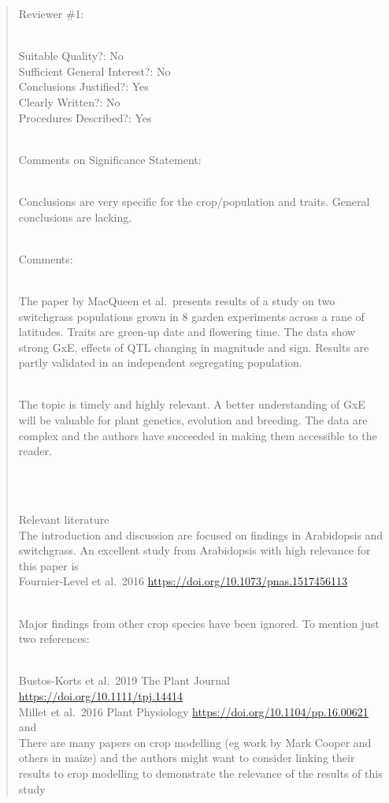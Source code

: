 \documentclass[
  letterpaper,
  DIV=11,
  numbers=noendperiod]{scrartcl}
\begin{document}
\begin{quote}
\begin{tcolorbox}[enhanced jigsaw, colframe=quarto-callout-warning-color-frame, rightrule=.15mm, leftrule=.75mm, left=2mm, breakable, toprule=.15mm, arc=.35mm, bottomrule=.15mm, opacityback=0, colback=white]

Reviewer \#1:\\
\strut \\
Suitable Quality?: No\\
Sufficient General Interest?: No\\
Conclusions Justified?: Yes\\
Clearly Written?: No\\
Procedures Described?: Yes\\
\strut \\
Comments on Significance Statement:\\
\strut \\
Conclusions are very specific for the crop/population and traits.
General conclusions are lacking.\\
\strut \\
Comments:\\
\strut \\
The paper by MacQueen et al.~presents results of a study on two
switchgrass populations grown in 8 garden experiments across a rane of
latitudes. Traits are green-up date and flowering time. The data show
strong GxE, effects of QTL changing in magnitude and sign. Results are
partly validated in an independent segregating population.\\
\strut \\
The topic is timely and highly relevant. A better understanding of GxE
will be valuable for plant genetics, evolution and breeding. The data
are complex and the authors have succeeded in making them accessible to
the reader.\\
\strut \\
\strut \\
Relevant literature\\
The introduction and discussion are focused on findings in Arabidopsis
and switchgrass. An excellent study from Arabidopsis with high relevance
for this paper is\\
Fournier-Level et al.~2016
\url{https://doi.org/10.1073/pnas.1517456113}\\
\strut \\
Major findings from other crop species have been ignored. To mention
just two references:\\
\strut \\
Bustos-Korts et al.~2019 The Plant Journal
\url{https://doi.org/10.1111/tpj.14414}\\
Millet et al.~2016 Plant Physiology
\url{https://doi.org/10.1104/pp.16.00621} and\\
There are many papers on crop modelling (eg work by Mark Cooper and
others in maize) and the authors might want to consider linking their
results to crop modelling to demonstrate the relevance of the results of
this study

\end{tcolorbox}
\end{quote}
\end{document}
